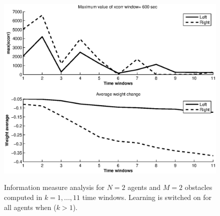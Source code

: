 \begin{figure}[htbp]
\begin{center}
{	\includegraphics[scale=0.3]{figures/infomeasure/N2/maxcorr_N=1_w=600.eps}}
	\hspace{1pt}
    \caption[Max correlation for two learning agents]{Information measure analysis for $N=2$ agents
	      and $M=2$ obstacles computed in $k=1,...,11$ time windows.
	      Learning is switched on for all agents when ($k>1$). \label{fig:N2M2}}
  \end{center}
\end{figure}

